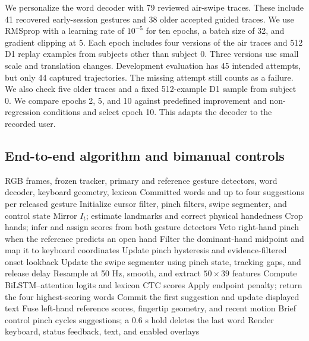 \documentclass[preprint,12pt]{elsarticle}
\begin{document}
We personalize the word decoder with 79 reviewed air-swipe traces. These include 41 recovered early-session gestures and 38 older accepted guided traces. We use RMSprop with a learning rate of $10^{-5}$ for ten epochs, a batch size of 32, and gradient clipping at 5. Each epoch includes four versions of the air traces and 512 D1 replay examples from subjects other than subject 0. Three versions use small scale and translation changes. Development evaluation has 45 intended attempts, but only 44 captured trajectories. The missing attempt still counts as a failure. We also check five older traces and a fixed 512-example D1 sample from subject 0. We compare epochs 2, 5, and 10 against predefined improvement and non-regression conditions and select epoch 10. This adapts the decoder to the recorded user.

\subsection{End-to-end algorithm and bimanual controls}
\begin{algorithm}[H]
\caption{WebSwipe inference for each timestamped camera frame}
\label{alg:webswipe}
\begin{algorithmic}[1]
\Require RGB frames, frozen tracker, primary and reference gesture detectors, word decoder, keyboard geometry, lexicon
\Ensure Committed words and up to four suggestions per released gesture
\State Initialize cursor filter, pinch filters, swipe segmenter, and control state
\State Mirror $I_t$; estimate landmarks and correct physical handedness
\State Crop hands; infer and assign scores from both gesture detectors
\State Veto right-hand pinch when the reference predicts an open hand
\State Filter the dominant-hand midpoint and map it to keyboard coordinates
\State Update pinch hysteresis and evidence-filtered onset lookback
\State Update the swipe segmenter using pinch state, tracking gaps, and release delay
\State Resample at 50 Hz, smooth, and extract $50\times39$ features
\State Compute BiLSTM--attention logits and lexicon CTC scores
\State Apply endpoint penalty; return the four highest-scoring words
\State Commit the first suggestion and update displayed text
\EndIf
\State Fuse left-hand reference scores, fingertip geometry, and recent motion
\State Brief control pinch cycles suggestions; a 0.6 s hold deletes the last word
\State Render keyboard, status feedback, text, and enabled overlays
\EndFor
\end{algorithmic}
\end{algorithm}
\end{document}
